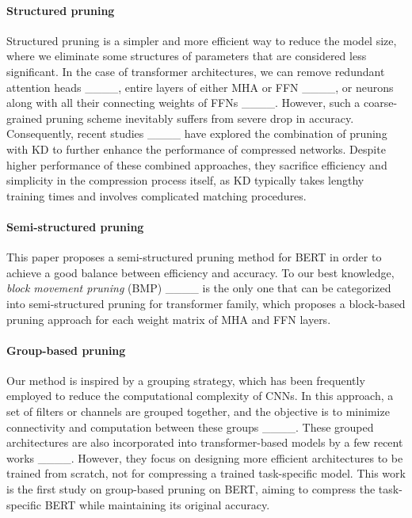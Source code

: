 \paragraph{Structured pruning} 
Structured pruning is a simpler and more efficient way to reduce the model size, where we eliminate some structures of parameters that are considered less significant. In the case of transformer architectures, we can remove redundant attention heads ____, entire layers of either MHA or FFN ____, or neurons along with all their connecting weights of FFNs ____. However, such a coarse-grained pruning scheme inevitably suffers from severe drop in accuracy. Consequently, recent studies ____ have explored the combination of pruning with KD to further enhance the performance of compressed networks. Despite higher performance of these combined approaches, they sacrifice efficiency and simplicity in the compression process itself, as KD typically takes lengthy training times and involves complicated matching procedures.

\paragraph{Semi-structured pruning} This paper proposes a semi-structured pruning method for BERT in order to achieve a good balance between efficiency and accuracy. To our best knowledge, \textit{block movement pruning} (BMP) ____ is the only one that can be categorized into semi-structured pruning for transformer family, which proposes a block-based pruning approach for each weight matrix of MHA and FFN layers. 

\paragraph{Group-based pruning} 
Our method is inspired by a grouping strategy, which has been frequently employed to reduce the computational complexity of CNNs. In this approach, a set of filters or channels are grouped together, and the objective is to minimize connectivity and computation between these groups ____. These grouped architectures are also incorporated into transformer-based models by a few recent works ____. However, they focus on designing more efficient architectures to be trained from scratch, not for compressing a trained task-specific model. This work is the first study on group-based pruning on BERT, aiming to compress the task-specific BERT while maintaining its original accuracy.